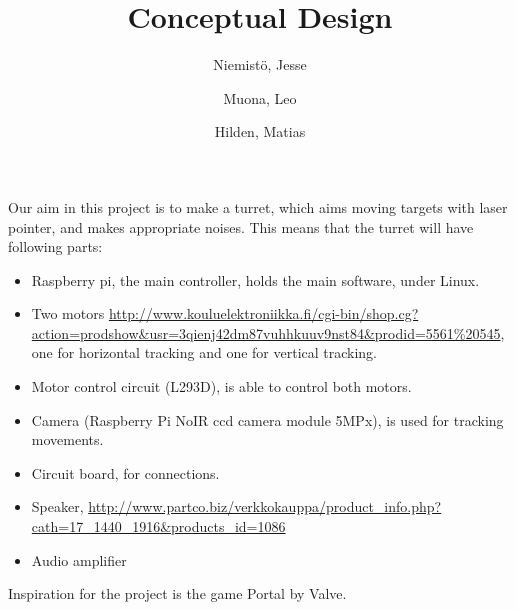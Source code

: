 \documentclass[english,11pt,twoside,a4paper]{article}
\begin{document}
\author{
  Niemistö, Jesse
  \and
  Muona, Leo
  \and
  Hilden, Matias
}
\title{Conceptual Design}

\maketitle

Our aim in this project is to make a turret, which aims moving targets with laser pointer, and makes appropriate noises. This means that the turret will have following parts:

\begin{itemize}
  \item Raspberry pi, the main controller, holds the main software, under Linux.
  \item Two motors \url{http://www.kouluelektroniikka.fi/cgi-bin/shop.cg?action=prodshow\&usr=3qienj42dm87vuhhkuuv9nst84\&prodid=5561\%20545}, one for horizontal tracking and one for vertical tracking.
  \item Motor control circuit (L293D), is able to control both motors.
  \item Camera (Raspberry Pi NoIR ccd camera module 5MPx), is used for tracking movements.
  \item Circuit board, for connections.
  \item Speaker, \url{http://www.partco.biz/verkkokauppa/product\_info.php?cath=17\_1440\_1916\&products\_id=1086}
  \item Audio amplifier
\end{itemize}

Inspiration for the project is the game Portal by Valve. 
\end{document}
